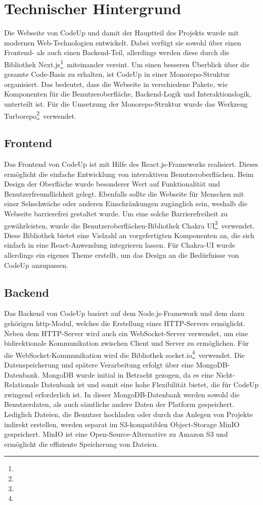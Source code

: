 \documentclass[main.tex]{subfiles}
\begin{document}
    \section{Technischer Hintergrund}
    Die Webseite von CodeUp und damit der Hauptteil des Projekts wurde mit modernen Web-Technologien entwickelt.
    Dabei verfügt sie sowohl über einen Frontend- als auch einen Backend-Teil, allerdings werden diese durch die Bibliothek \dq Next.js\dq \footnote{}\ miteinander vereint.
    Um einen besseren Überblick über die gesamte Code-Basis zu erhalten, ist CodeUp in einer Monorepo-Struktur organisiert.
    Das bedeutet, dass die Webseite in verschiedene Pakete, wie Komponenten für die Benutzeroberfläche, Backend-Logik und Interaktionslogik, unterteilt ist.
    Für die Umsetzung der Monorepo-Struktur wurde das Werkzeug \dq Turborepo\dq \footnote{}\ verwendet.
    \subsection{Frontend}
    Das Frontend von CodeUp ist mit Hilfe des React.js-Frameworks realisiert.
    Dieses ermöglicht die einfache Entwicklung von interaktiven Benutzeroberflächen.
    Beim Design der Oberfläche wurde besonderer Wert auf Funktionalität und Benutzerfreundlichkeit gelegt.
    Ebenfalls sollte die Webseite für Menschen mit einer Sehschwäche oder anderen Einschränkungen zugänglich sein, weshalb die Webseite barrierefrei gestaltet wurde.
    Um eine solche Barrierefreiheit zu gewährleisten, wurde die Benutzeroberflächen-Bibliothek \dq Chakra UI\dq \footnote{}\ verwendet.
    Diese Bibliothek bietet eine Vielzahl an vorgefertigten Komponenten an, die sich einfach in eine React-Anwendung integrieren lassen.
    Für Chakra-UI wurde allerdings ein eigenes Theme erstellt, um das Design an die Bedürfnisse von CodeUp anzupassen.

    \subsection{Backend}
    Das Backend von CodeUp basiert auf dem Node.js-Framework und dem dazu gehörigen \dq http\dq-Modul, welches die Erstellung eines HTTP-Servers ermöglicht.
    Neben dem HTTP-Server wird auch ein WebSocket-Server verwendet, um eine bidirektionale Kommunikation zwischen Client und Server zu ermöglichen.
    Für die WebSocket-Kommunikation wird die Bibliothek \dq socket.io\dq \footnote{}\ verwendet.
    Die Datenspeicherung und spätere Verarbeitung erfolgt über eine MongoDB-Datenbank.
    MongoDB wurde initial in Betracht gezogen, da es eine Nicht-Relationale Datenbank ist und somit eine hohe Flexibilität bietet, die für CodeUp zwingend erforderlich ist.
    In dieser MongoDB-Datenbank werden sowohl die Benutzerdaten, als auch sämtliche andere Daten der Platform gespeichert.
    Lediglich Dateien, die Benutzer hochladen oder durch das Anlegen von Projekte indirekt erstellen, werden separat im S3-kompatiblen Object-Storage MinIO gespeichert.
    MinIO ist eine Open-Source-Alternative zu Amazon S3 und ermöglicht die effiziente Speicherung von Dateien.
\end{document}
